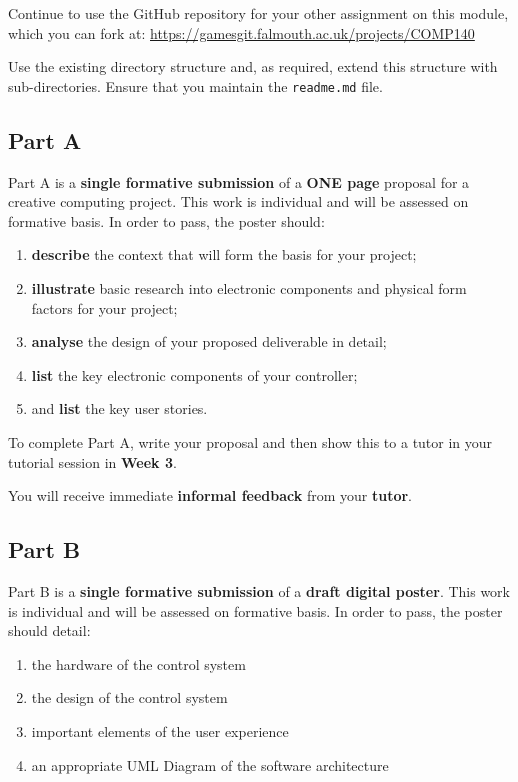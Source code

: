 \documentclass{../../fal_assignment}
\begin{document}
	Continue to use the GitHub repository for your other assignment on this module, which you can fork at:	
	\indent \url{https://gamesgit.falmouth.ac.uk/projects/COMP140}
	
	Use the existing directory structure and, as required, extend this structure with sub-directories. Ensure that you maintain the \texttt{readme.md} file.

\subsection*{Part A}

Part A is a \textbf{single formative submission} of a \textbf{ONE page} proposal for a creative computing project. This work is individual and will be assessed on formative basis. In order to pass, the poster should:

    \begin{enumerate}[label=\roman*.]
		\item \textbf{describe} the context that will form the basis for your project;
		\item \textbf{illustrate} basic research into electronic components and physical form factors for your project;
		\item \textbf{analyse} the design of your proposed deliverable in detail;
		\item \textbf{list} the key electronic components of your controller;
		\item and \textbf{list} the key user stories.
	\end{enumerate}

To complete Part A, write your proposal and then show this to a tutor in your tutorial session in \textbf{Week 3}.

You will receive immediate \textbf{informal feedback} from your \textbf{tutor}.

\subsection*{Part B}

Part B is a \textbf{single formative submission} of a \textbf{draft digital poster}. This work is individual and will be assessed on formative basis. In order to pass, the poster should detail:

\begin{enumerate}[label=\roman*.]
	\item the hardware of the control system
	\item the design of the control system
	\item important elements of the user experience
	\item an appropriate UML Diagram of the software architecture
\end{enumerate}
\end{document}
